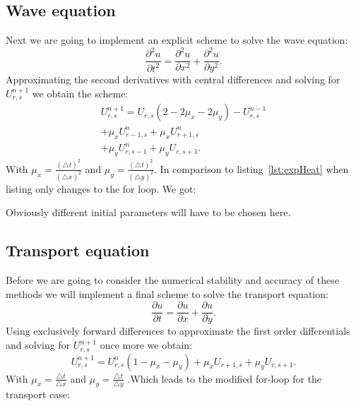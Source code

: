 \subsection{Wave equation}
Next we are going to implement an explicit scheme to solve the wave equation:
\begin{equation}
\frac{\partial^2 u}{\partial t^2} = \frac{\partial^2 u}{\partial x^2} + \frac{\partial^2 u}{\partial y^2}.
\end{equation}
Approximating the second derivatives with central differences and solving for $U_{r,s}^{n+1}$ we obtain the scheme:
\begin{align*}
U_{r,s}^{n+1} = U_{r,s}(2 - 2\mu_x - 2 \mu_y) - U_{r,s}^{n-1} \\
				 + \mu_x U_{r-1,s}^n + \mu_x U_{r+1,s}^n	  \\
				 + \mu_y U_{r,s-1}^n + \mu_y U_{r,s+1}.
\end{align*}
With $\mu_x = \frac{(\triangle t)^2}{(\triangle x)^2} $ and $\mu_y = \frac{(\triangle t)^2}{(\triangle y)^2} $. In comparison to listing~\ref{lst:expHeat} when listing only changes to the for loop. We got:

Obviously different initial parameters will have to be chosen here.


\subsection{Transport equation}
Before we are going to consider the numerical stability and accuracy of these methods we will implement a final scheme to solve the transport equation:
\begin{equation}
\frac{\partial u}{\partial t} = \frac{\partial u}{\partial x} + \frac{\partial u}{\partial y}.
\end{equation} 
Using exclusively forward differences to approximate the first order differentials and solving for $U_{r,s}^{n+1}$ once more we obtain:
\begin{equation}
U_{r,s}^{n+1} = U_{r,s}^n (1 - \mu_x - \mu_y) + \mu_x U_{r+1,s} + \mu_y U_{r,s+1}.
\end{equation}
With $\mu_x = \frac{\triangle t}{\triangle x} $ and $\mu_y = \frac{\triangle t}{\triangle y} $ .Which leads to the modified for-loop for the transport case:



